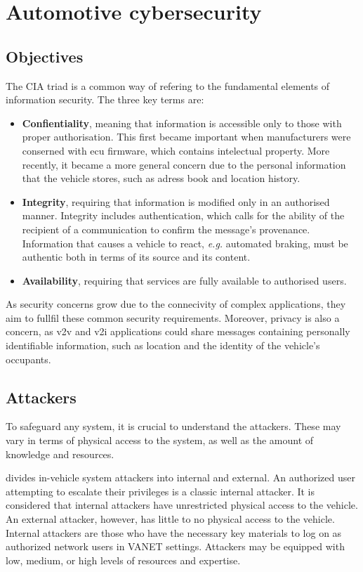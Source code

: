 \section{Automotive cybersecurity}

\subsection{Objectives}

The CIA triad is a common way of refering to the fundamental elements of information security. The three key terms are:

\begin{itemize}
    \item \textbf{Confientiality}, meaning that information is accessible only to those with proper authorisation. This first became important when manufacturers were conserned with \gls{ecu} firmware, which contains intelectual property. More recently, it became a more general concern due to the personal information that the vehicle stores, such as adress book and location history.
    \item \textbf{Integrity}, requiring that information is modified only in an authorised manner. Integrity includes authentication, which calls for the ability of the recipient of a communication to confirm the message's provenance. Information that causes a vehicle to react, \textit{e.g.} automated braking, must be authentic both in terms of its source and its content.
    \item \textbf{Availability}, requiring that services are fully available to authorised users.
\end{itemize}

As security concerns grow due to the connecivity of complex applications, they aim to fullfil these common security requirements. Moreover, privacy is also a concern, as \gls{v2v} and \gls{v2i} applications could share messages containing personally identifiable information, such as location and the identity of the vehicle's occupants.

\subsection{Attackers}

To safeguard any system, it is crucial to understand the attackers. These may vary in terms of physical access to the system, as well as the amount of knowledge and resources.\par
\cite{wolf2009} divides in-vehicle system attackers into internal and external. An authorized user attempting to escalate their privileges is a classic internal attacker. It is considered that internal attackers have unrestricted physical access to the vehicle. An external attacker, however, has little to no physical access to the vehicle. Internal attackers are those who have the necessary key materials to log on as authorized network users in VANET settings. Attackers may be equipped with low, medium, or high levels of resources and expertise.

